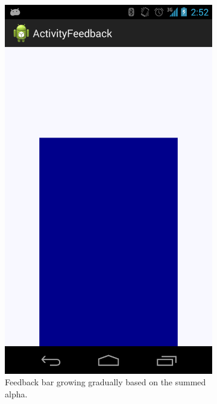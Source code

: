 \documentclass[a4paper,10pt,english,lof,lot,twoside]{puthesis}
\begin{document}
\begin{figure}
\begin{subfigure}[t]{0.30\linewidth}
\includegraphics[width=0.800\linewidth]{early-prototype-feedback-bar-growing.png}
\caption[Feedback bar growing]{Feedback bar growing gradually based on the summed alpha.}\label{ch-design/index:fig-early-prototype-feedback-bar-growing}\end{subfigure}
\begin{subfigure}[t]{0.30\linewidth}
\centering
\capstart


\end{subfigure}
\end{figure}
\end{document}
